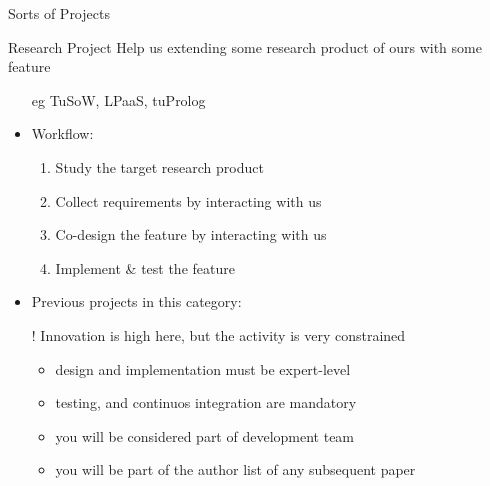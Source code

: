 \documentclass[presentation]{beamer}\mode<presentation>{\usetheme{AMSBolognaFC}}
\begin{document}
\begin{frame}[c, allowframebreaks]{Sorts of Projects}
    \begin{block}{Research \courseAcronym{} Project}
        Help us extending some research product of ours with some feature
        \begin{itemize}
            \item[eg] TuSoW, LPaaS, tuProlog
            \item Workflow:
            \begin{enumerate}
                \item Study the target research product
                \item Collect requirements by interacting with us
                \item Co-design the feature by interacting with us
                \item Implement \& test the feature
            \end{enumerate}
            \item Previous projects in this category: 
            \item[!] Innovation is high here, but the activity is very constrained
            \begin{itemize}
                \item design and implementation must be expert-level
                \item testing, and continuos integration are mandatory
                \item you will be considered part of development team
                \item you will be part of the author list of any subsequent paper
            \end{itemize}
        \end{itemize}
    \end{block}


\end{frame}
\end{document}
